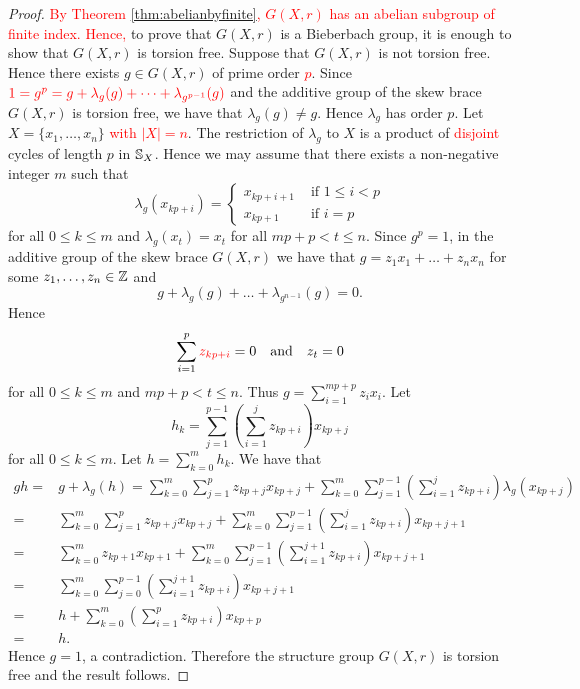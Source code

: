 \begin{proof}
\textcolor{red}{By Theorem \ref{thm:abelianbyfinite}, $G(X,r)$ has an abelian subgroup of finite index.
Hence,} to prove that $G(X,r)$ is a Bieberbach group, it is enough to show that $G(X,r)$ is torsion free.
Suppose that $G(X,r)$ is not torsion free. Hence there exists $g\in G(X,r)$ of prime order \textcolor{red}{$p$}. Since
$\textcolor{red}{1=g^p=g+\lambda_g(g)+\dots +\lambda_{g^{p-1}}(g)}$ and the additive group of the skew brace $G(X,r)$ is torsion free, we have that $\lambda_g(g)\neq g$. Hence $\lambda_g$ has order $p$. Let $X=\{ x_1,\dots ,x_n\}$ \textcolor{red}{with $|X|=n$}. The restriction of $\lambda_g$ to $X$ is a product of \textcolor{red}{disjoint} cycles of length $p$ in $\mathbb{S}_X$. Hence we may assume that there exists a non-negative integer $m$ such that
\[\lambda_g(x_{kp+i})=\left\{\begin{array}{ll}
x_{kp+i+1}&\text{ if }1\leq i<p\\
x_{kp+1}&\text{ if }i=p\end{array}\right.\]
for all $0\leq k\leq m$ and $\lambda_g(x_t)=x_t$ for all $mp+p<t\leq n$.
Since $g^p=1$, in the additive group of the skew brace $G(X,r)$ we have that $g=z_1x_1+\dots +z_nx_n$ for some $z_1,\dots ,z_n\in\mathbb{Z}$ and 
\[g+\lambda_g(g)+\dots +\lambda_{g^{n-1}}(g)=0.\]
Hence
\[\sum_{i=1}^p\textcolor{red}{z_{kp+i}}=0\quad\text{and}\quad z_t=0\]
for all $0\leq k\leq m$ and $mp+p<t\leq n$. Thus $g=\sum_{i=1}^{mp+p}z_ix_i$. Let
\[ 
h_k=\sum_{j=1}^{p-1}\left(\sum_{i=1}^jz_{kp+i}\right)x_{kp+j}
\]
for all $0\leq k\leq m$. Let $h=\sum_{k=0}^mh_k$. We have that
\begin{align*}
    gh=&g+\lambda_g(h)=\sum_{k=0}^m\sum_{j=1}^pz_{kp+j}x_{kp+j}+\sum_{k=0}^m\sum_{j=1}^{p-1}\left(\sum_{i=1}^jz_{kp+i}\right)\lambda_g(x_{kp+j})\\
    =&\sum_{k=0}^m\sum_{j=1}^pz_{kp+j}x_{kp+j}+\sum_{k=0}^m\sum_{j=1}^{p-1}\left(\sum_{i=1}^jz_{kp+i}\right)x_{kp+j+1}\\
    =&\sum_{k=0}^mz_{kp+1}x_{kp+1}+\sum_{k=0}^m\sum_{j=1}^{p-1}\left(\sum_{i=1}^{j+1}z_{kp+i}\right)x_{kp+j+1}\\
    =&\sum_{k=0}^m\sum_{j=0}^{p-1}\left(\sum_{i=1}^{j+1}z_{kp+i}\right)x_{kp+j+1}\\
    =&h+\sum_{k=0}^m\left(\sum_{i=1}^pz_{kp+i}\right)x_{kp+p}\\
    =&h.
\end{align*}
Hence $g=1$, a contradiction. Therefore the structure group $G(X,r)$ is torsion free and the result follows.
\end{proof}




